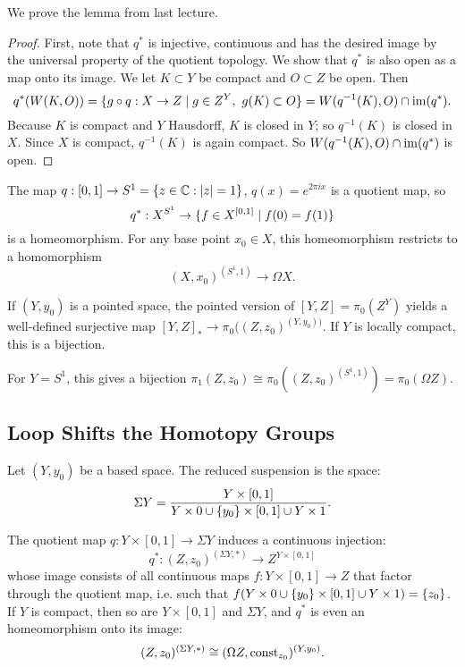 

We prove the lemma from last lecture.

\begin{proof}
First, note that $q^*$ is injective, continuous and has the desired image by the universal property of the quotient topology. We show that $q^*$ is also open as a map onto its image. We let $K\subset Y$ be compact and $O\subset Z$ be open. Then
\[q^*(W(K,O))=\{g\circ q:X\to Z\mid g\in Z^Y,\ g(K)\subset O\}=W(q^{-1}(K),O)\cap\operatorname{im}(q^*).\]
Because $K$ is compact and $Y$ Hausdorff, $K$ is closed in $Y$; so $q^{-1}(K)$ is closed in $X$. Since $X$ is compact, $q^{-1}(K)$ is again compact. So $W(q^{-1}(K),O)\cap\operatorname{im}(q^*)$ is open.
\end{proof}

\begin{example}
The map $q:[0,1]\to S^1=\{z\in\mathbb{C}:|z|=1\}$, $q(x)=e^{2\pi ix}$ is a quotient map, so
\[q^*:X^{S^1}\to\{f\in X^{[0,1]}\mid f(0)=f(1)\}\]
is a homeomorphism. For any base point $x_0\in X$, this homeomorphism restricts to a homomorphism
\[(X,x_0)^{(S^1,1)}\to\Omega X.\]

If $(Y,y_0)$ is a pointed space, the pointed version of $[Y,Z]=\pi_0(Z^Y)$ yields a well-defined surjective map $[Y,Z]_*\to\pi_0((Z,z_0)^{(Y,y_0))}$. If $Y$ is locally compact, this is a bijection.

For $Y=S^1$, this gives a bijection $\pi_1(Z,z_0)\cong\pi_0((Z,z_0)^{(S^1,1)})=\pi_0(\Omega Z)$.
\end{example}

\subsection{Loop Shifts the Homotopy Groups}

Let $(Y,y_0)$ be a based space. The reduced suspension is the space:
\[\Sigma Y=\frac{Y\times[0,1]}{Y\times 0\cup\{y_0\}\times[0,1]\cup Y\times 1}.\]

The quotient map $q:Y\times[0,1]\to\Sigma Y$ induces a continuous injection:
\[q^*:(Z,z_0)^{(\Sigma Y,*)}\to Z^{Y\times[0,1]}\]
whose image consists of all continuous maps $f:Y\times[0,1]\to Z$ that factor through the quotient map, i.e. such that $f(Y\times 0\cup\{y_0\}\times[0,1]\cup Y\times 1)=\{z_0\}$. If $Y$ is compact, then so are $Y\times[0,1]$ and $\Sigma Y$, and $q^*$ is even an homeomorphism onto its image:
\[(Z,z_0)^{(\Sigma Y,*)}\cong(\Omega Z,\operatorname{const}_{z_0})^{(Y,y_0)}.\]

